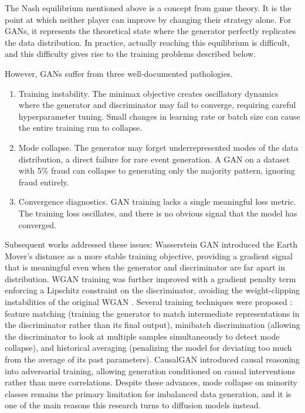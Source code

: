 The Nash equilibrium mentioned above is a concept from game theory. It is the point at which neither player can improve by changing their strategy alone. For GANs, it represents the theoretical state where the generator perfectly replicates the data distribution. In practice, actually reaching this equilibrium is difficult, and this difficulty gives rise to the training problems described below.

However, GANs suffer from three well-documented pathologies.
\begin{enumerate}
    \item Training instability. The minimax objective creates oscillatory dynamics where the generator and discriminator may fail to converge, requiring careful hyperparameter tuning. Small changes in learning rate or batch size can cause the entire training run to collapse.

    \item Mode collapse. The generator may forget underrepresented modes of the data distribution, a direct failure for rare event generation. A GAN on a dataset with 5\% fraud can collapse to generating only the majority pattern, ignoring fraud entirely.

    \item Convergence diagnostics. GAN training lacks a single meaningful loss metric. The training loss oscillates, and there is no obvious signal that the model has converged.
\end{enumerate}

Subsequent works addressed these issues: Wasserstein GAN \cite{arjovsky2017wgan} introduced the Earth Mover's distance as a more stable training objective, providing a gradient signal that is meaningful even when the generator and discriminator are far apart in distribution. WGAN training was further improved with a gradient penalty term enforcing a Lipschitz constraint on the discriminator, avoiding the weight-clipping instabilities of the original WGAN \cite{gulrajani2017wgangp}. Several training techniques were proposed \cite{salimans2016improved}: feature matching (training the generator to match intermediate representations in the discriminator rather than its final output), minibatch discrimination (allowing the discriminator to look at multiple samples simultaneously to detect mode collapse), and historical averaging (penalizing the model for deviating too much from the average of its past parameters). CausalGAN \cite{kocaoglu2018causalgan} introduced causal reasoning into adversarial training, allowing generation conditioned on causal interventions rather than mere correlations. Despite these advances, mode collapse on minority classes remains the primary limitation for imbalanced data generation, and it is one of the main reasons this research turns to diffusion models instead.

